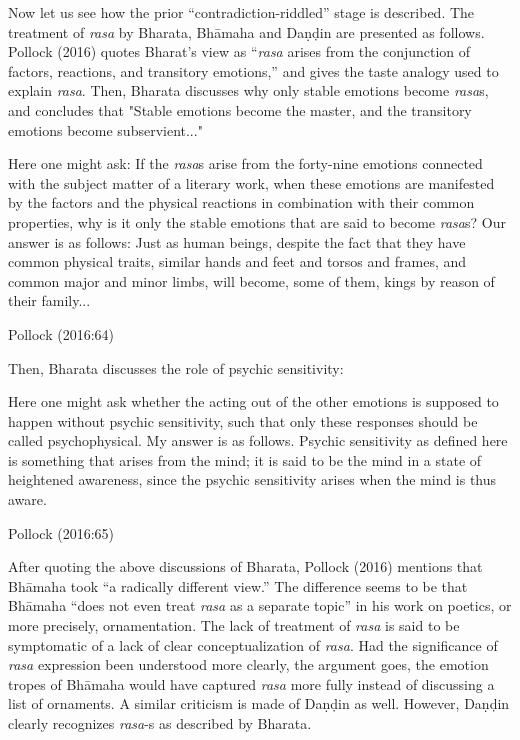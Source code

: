 Now let us see how the prior “contradiction-riddled” stage is described. The treatment of \textsl{rasa} by Bharata, Bhāmaha and Daṇḍin are presented as follows. Pollock (2016) quotes Bharat’s view as “\textsl{rasa} arises from the conjunction of factors, reactions, and transitory emotions,” and gives the taste analogy used to explain \textsl{rasa}. Then, Bharata discusses why only stable emotions become \textsl{rasa}s, and concludes that "Stable emotions become the master, and the transitory emotions become subservient..." 

\begin{myquote}
[343] Here one might ask: If the \textsl{rasa}s arise from the forty-nine emotions connected with the subject matter of a literary work, when these emotions are manifested by the factors and the physical reactions in combination with their common properties, why is it only the stable emotions that are said to become \textsl{rasa}s? Our answer is as follows: Just as human beings, despite the fact that they have common physical traits, similar hands and feet and torsos and frames, and common major and minor limbs, will become, some of them, kings by reason of their family...

\hfill Pollock (2016:64)
\end{myquote}

Then, Bharata discusses the role of psychic sensitivity:

\begin{myquote}
[373.3] Here one might ask whether the acting out of the other emotions is supposed to happen without psychic sensitivity, such that only these responses should be called psychophysical. My answer is as follows. Psychic sensitivity as defined here is something that arises from the mind; it is said to be the mind in a state of heightened awareness, since the psychic sensitivity arises when the mind is thus aware.

\hfill Pollock (2016:65)
\end{myquote}

After quoting the above discussions of Bharata, Pollock (2016) mentions that Bhāmaha took “a radically different view.” The difference seems to be that Bhāmaha “does not even treat \textsl{rasa} as a separate topic” in his work on poetics, or more precisely, ornamentation. The lack of treatment of \textsl{rasa} is said to be symptomatic of a lack of clear conceptualization of \textsl{rasa}. Had the significance of \textsl{rasa} expression been understood more clearly, the argument goes, the emotion tropes of Bhāmaha would have captured \textsl{rasa} more fully instead of discussing a list of ornaments. A similar criticism is made of Daṇḍin as well. However, Daṇḍin clearly recognizes \textsl{rasa}-s as described by Bharata. 

